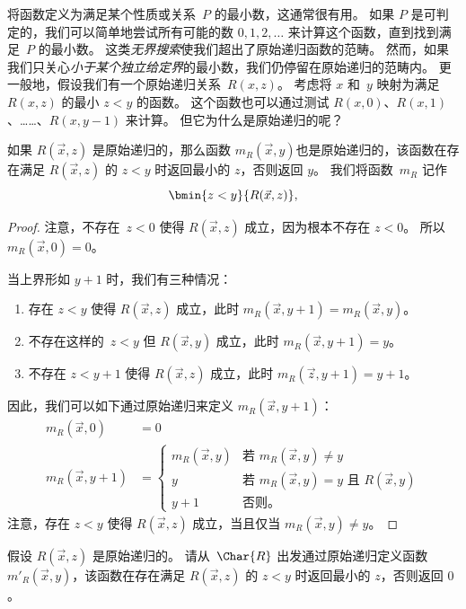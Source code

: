 \documentclass[../../../include/open-logic-section]{subfiles}
\begin{document}

\begin{explain}
将函数定义为满足某个性质或关系~$P$ 的最小数，这通常很有用。
如果 $P$ 是可判定的，我们可以简单地尝试所有可能的数 $0, 1, 2, \dots$ 来计算这个函数，直到找到满足~$P$ 的最小数。
这类\emph{无界搜索}使我们超出了原始递归函数的范畴。
然而，如果我们只关心\emph{小于某个独立给定界}的最小数，我们仍停留在原始递归的范畴内。
更一般地，假设我们有一个原始递归关系~$R(x,z)$。
考虑将 $x$ 和~$y$ 映射为满足 $R(x, z)$ 的最小 $z < y$ 的函数。
这个函数也可以通过测试 $R(x, 0)$、$R(x, 1)$、……、$R(x, y-1)$ 来计算。
但它为什么是原始递归的呢？
\end{explain}

\begin{prop}
如果 $R(\vec x, z)$ 是原始递归的，那么函数
$m_R(\vec{x}, y)$也是原始递归的，该函数在存在满足 $R(\vec x, z)$ 的 $z<y$ 时返回最小的 $z$，否则返回 $y$。
我们将函数~$m_R$ 记作
\[
\bmin{z < y}{R(\vec{x}, z)},
\]
\end{prop}

\begin{proof}
注意，不存在~$z < 0$ 使得 $R(\vec{x}, z)$ 成立，因为根本不存在 $z < 0$。
所以 $m_R(\vec x, 0) = 0$。

当上界形如 $y + 1$ 时，我们有三种情况：
\begin{enumerate}
\item 存在 $z < y$ 使得 $R(\vec{x}, z)$ 成立，此时
$m_R(\vec{x}, y+1) = m_R(\vec{x}, y)$。
\item 不存在这样的~$z<y$ 但 $R(\vec{x}, y)$ 成立，此时
$m_R(\vec{x}, y+1) = y$。
\item 不存在 $z < y+1$ 使得 $R(\vec{x}, z)$ 成立，此时
$m_R(\vec{z}, y+1) = y+1$。
\end{enumerate}
因此，我们可以如下通过原始递归来定义 $m_R(\vec x, y+1)$：
\begin{align*}
m_R(\vec{x}, 0) & = 0\\
m_R(\vec{x}, y+1) & =
\begin{cases}
m_R(\vec{x}, y) & \text{若 $m_R(\vec x, y) \neq y$}\\
y & \text{若 $m_R(\vec x, y) = y$ 且 $R(\vec{x}, y)$}\\
y+1 & \text{否则。}
\end{cases}
\end{align*}
注意，存在 $z<y$ 使得 $R(\vec x, z)$ 成立，当且仅当 $m_R(\vec x,
y) \neq y$。
\end{proof}

\begin{prob}
假设 $R(\vec x, z)$ 是原始递归的。
请从~$\Char{R}$ 出发通过原始递归定义函数
$m'_R(\vec{x}, y)$，该函数在存在满足 $R(\vec{x}, z)$ 的 $z<y$ 时返回最小的 $z$，否则返回 $0$。
\end{prob}
\end{document}
